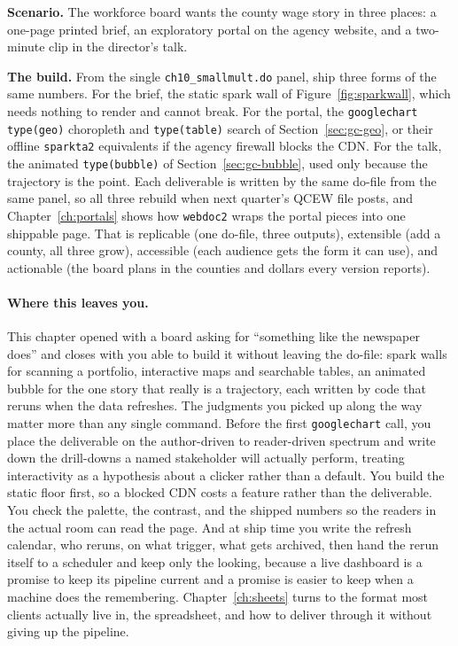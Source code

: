 \begin{appliedexample}\label{ae:ch10-threedeliv}
\textbf{Scenario.} The workforce board wants the county wage story in three places: a one-page printed brief, an exploratory portal on the agency website, and a two-minute clip in the director's talk.

\medskip
\textbf{The build.} From the single \texttt{ch10\_smallmult.do} panel, ship three forms of the same numbers. For the brief, the static spark wall of Figure~\ref{fig:sparkwall}, which needs nothing to render and cannot break. For the portal, the \texttt{googlechart type(geo)} choropleth and \texttt{type(table)} search of Section~\ref{sec:gc-geo}, or their offline \texttt{sparkta2} equivalents if the agency firewall blocks the CDN. For the talk, the animated \texttt{type(bubble)} of Section~\ref{sec:gc-bubble}, used only because the trajectory is the point. Each deliverable is written by the same do-file from the same panel, so all three rebuild when next quarter's QCEW file posts, and Chapter~\ref{ch:portals} shows how \texttt{webdoc2} wraps the portal pieces into one shippable page. That is replicable (one do-file, three outputs), extensible (add a county, all three grow), accessible (each audience gets the form it can use), and actionable (the board plans in the counties and dollars every version reports).
\end{appliedexample}

\paragraph{Where this leaves you.} This chapter opened with a board asking for \enquote{something like the newspaper does} and closes with you able to build it without leaving the do-file: spark walls for scanning a portfolio, interactive maps and searchable tables, an animated bubble for the one story that really is a trajectory, each written by code that reruns when the data refreshes. The judgments you picked up along the way matter more than any single command. Before the first \texttt{googlechart} call, you place the deliverable on the author-driven to reader-driven spectrum and write down the drill-downs a named stakeholder will actually perform, treating interactivity as a hypothesis about a clicker rather than a default. You build the static floor first, so a blocked CDN costs a feature rather than the deliverable. You check the palette, the contrast, and the shipped numbers so the readers in the actual room can read the page. And at ship time you write the refresh calendar, who reruns, on what trigger, what gets archived, then hand the rerun itself to a scheduler and keep only the looking, because a live dashboard is a promise to keep its pipeline current and a promise is easier to keep when a machine does the remembering. Chapter~\ref{ch:sheets} turns to the format most clients actually live in, the spreadsheet, and how to deliver through it without giving up the pipeline.

